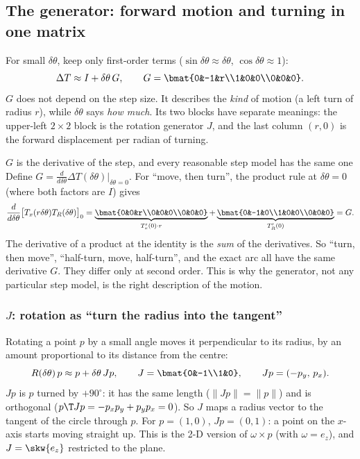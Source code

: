 \subsection{The generator: forward motion and turning in one matrix}\label{sec:pl:generator}

For small $\delta\theta$, keep only first-order terms ($\sin\delta\theta\approx\delta\theta$, $\cos\delta\theta\approx1$):
\begin{equation}
\Delta T\approx I+\delta\theta\,G,\qquad G=\bmat{0&-1&r\\1&0&0\\0&0&0}.\label{eq:pl:first-order}
\end{equation}
$G$ does not depend on the step size. It describes the \emph{kind} of motion (a left turn of radius $r$), while $\delta\theta$ says \emph{how much}. Its two blocks have separate meanings: the upper-left $2\times2$ block is the rotation generator $J$, and the last column $(r,0)$ is the forward displacement per radian of turning.

\begin{deriv}{$G$ is the derivative of the step, and every reasonable step model has the same one}
Define $G=\frac{d}{d\delta\theta}\Delta T(\delta\theta)\big|_{\delta\theta=0}$. For ``move, then turn'', the product rule at $\delta\theta=0$ (where both factors are $I$) gives
\[
\frac{d}{d\delta\theta}\big[T_x(r\delta\theta)T_R(\delta\theta)\big]_{0}=\underbrace{\bmat{0&0&r\\0&0&0\\0&0&0}}_{T_x'(0)\cdot r}+\underbrace{\bmat{0&-1&0\\1&0&0\\0&0&0}}_{T_R'(0)}=G.
\]
The derivative of a product at the identity is the \emph{sum} of the derivatives. So ``turn, then move'', ``half-turn, move, half-turn'', and the exact arc all have the same derivative $G$. They differ only at second order. This is why the generator, not any particular step model, is the right description of the motion.
\end{deriv}

\subsubsection{$J$: rotation as ``turn the radius into the tangent''}
Rotating a point $p$ by a small angle moves it perpendicular to its radius, by an amount proportional to its distance from the centre:
\[
R(\delta\theta)\,p\approx p+\delta\theta\,Jp,\qquad J=\bmat{0&-1\\1&0},\qquad Jp=(-p_y,\,p_x).
\]
$Jp$ is $p$ turned by $+90^\circ$: it has the same length ($\|Jp\|=\|p\|$) and is orthogonal ($p\T Jp=-p_xp_y+p_yp_x=0$). So $J$ maps a radius vector to the tangent of the circle through $p$. For $p=(1,0)$, $Jp=(0,1)$: a point on the $x$-axis starts moving straight up. This is the 2-D version of $\omega\times p$ (with $\omega=e_z$), and $J=\skw{e_z}$ restricted to the plane.

